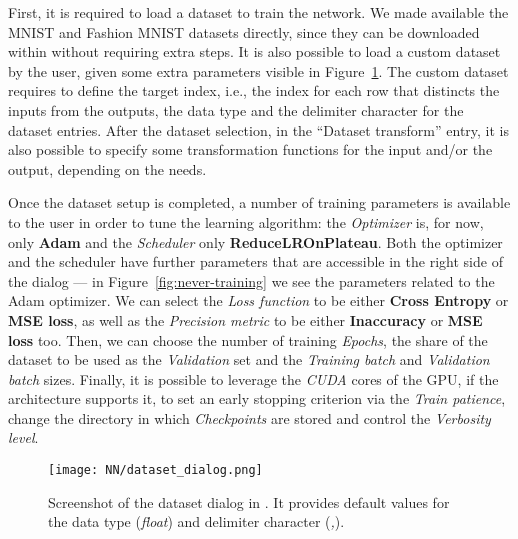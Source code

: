 First, it is required to load a dataset to train the network. We made available
the MNIST and Fashion MNIST datasets directly, since they can be downloaded within 
\pytorch{} without requiring extra steps. It is also possible to load a custom
dataset by the user, given some extra parameters visible in Figure~\ref{fig:never-dataset}.
The custom dataset requires to define the target index, i.e., the index for each
row that distincts the inputs from the outputs, the data type and the delimiter 
character for the dataset entries. After the dataset selection, in the ``Dataset
transform'' entry, it is also possible to specify some transformation functions 
for the input and/or the output, depending on the needs.

Once the dataset setup is completed, a number of training parameters is available 
to the user in order to tune the learning algorithm: the \textit{Optimizer} is, for
now, only \textbf{Adam} and the \textit{Scheduler} only \textbf{ReduceLROnPlateau}.
Both the optimizer and the scheduler have further parameters that are accessible 
in the right side of the dialog --- in Figure~\ref{fig:never-training} we see
the parameters related to the Adam optimizer. We can select the \textit{Loss
	function} to be either \textbf{Cross Entropy} or \textbf{MSE loss}, as
well as the \textit{Precision metric} to be either \textbf{Inaccuracy} or
\textbf{MSE loss} too. Then, we can choose the number of training \textit{Epochs},
the share of the dataset to be used as the \textit{Validation} set and the
\textit{Training batch} and \textit{Validation batch} sizes.
Finally, it is possible to leverage the \textit{CUDA} cores of the GPU, if the
architecture supports it, to set an early stopping criterion via the \textit{Train
	patience}, change the directory in which \textit{Checkpoints} are stored and
control the \textit{Verbosity level}.
%
\begin{figure}[t]
	\caption{\label{fig:never-dataset} Screenshot of the dataset dialog in
		\nevertwo{}. It provides default values for the data type (\textit{float})
		and delimiter character (\textit{,}).}
	\centering
	\texttt{[image: NN/dataset\_dialog.png]}
\end{figure}


